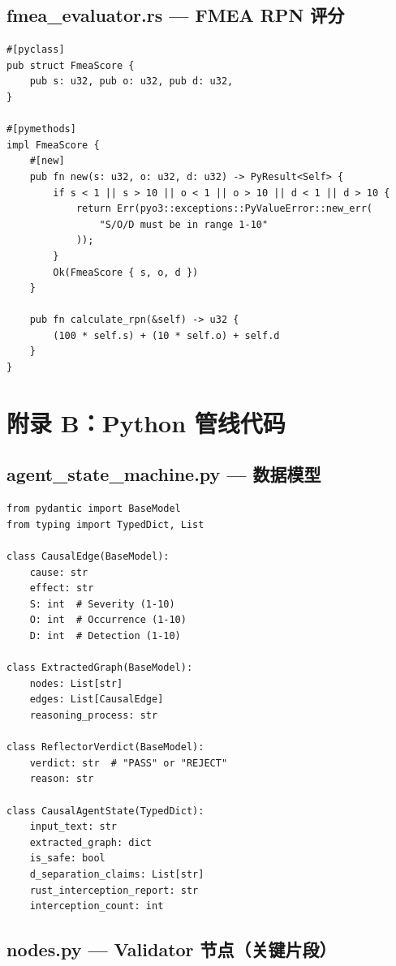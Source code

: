 \documentclass[12pt, a4paper]{ctexart}
\begin{document}
\subsection{fmea\_evaluator.rs — FMEA RPN 评分}

\begin{lstlisting}[style=rust, caption={FMEA 风险评分}]
#[pyclass]
pub struct FmeaScore {
    pub s: u32, pub o: u32, pub d: u32,
}

#[pymethods]
impl FmeaScore {
    #[new]
    pub fn new(s: u32, o: u32, d: u32) -> PyResult<Self> {
        if s < 1 || s > 10 || o < 1 || o > 10 || d < 1 || d > 10 {
            return Err(pyo3::exceptions::PyValueError::new_err(
                "S/O/D must be in range 1-10"
            ));
        }
        Ok(FmeaScore { s, o, d })
    }

    pub fn calculate_rpn(&self) -> u32 {
        (100 * self.s) + (10 * self.o) + self.d
    }
}
\end{lstlisting}

\newpage
\section{附录 B：Python 管线代码}

\subsection{agent\_state\_machine.py — 数据模型}

\begin{lstlisting}[style=python, caption={Pydantic 数据模型定义}]
from pydantic import BaseModel
from typing import TypedDict, List

class CausalEdge(BaseModel):
    cause: str
    effect: str
    S: int  # Severity (1-10)
    O: int  # Occurrence (1-10)
    D: int  # Detection (1-10)

class ExtractedGraph(BaseModel):
    nodes: List[str]
    edges: List[CausalEdge]
    reasoning_process: str

class ReflectorVerdict(BaseModel):
    verdict: str  # "PASS" or "REJECT"
    reason: str

class CausalAgentState(TypedDict):
    input_text: str
    extracted_graph: dict
    is_safe: bool
    d_separation_claims: List[str]
    rust_interception_report: str
    interception_count: int
\end{lstlisting}

\subsection{nodes.py — Validator 节点（关键片段）}
\end{document}
